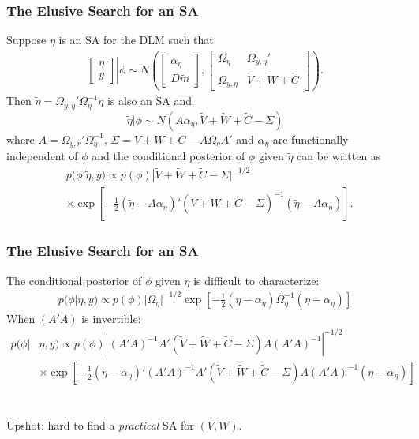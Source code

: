 \documentclass[xcolor=dvipsnames]{beamer}
\begin{document}
\begin{frame}
\frametitle{The Elusive Search for an SA}
Suppose $\eta$ is an SA for the DLM such that
\begin{align*}
 \left. \begin{bmatrix}\eta \\ y \end{bmatrix}\right|\phi \sim N\left(\begin{bmatrix} \alpha_\eta \\ D\tilde{m} \end{bmatrix}, \begin{bmatrix}
   \Omega_\eta & \Omega_{y,\eta}' \\
   \Omega_{y,\eta} & \tilde{V} + \tilde{W} + \tilde{C} \end{bmatrix}\right).
\end{align*}
Then $\tilde{\eta}=\Omega_{y,\eta}'\Omega_{\eta}^{-1}\eta$ is also an SA and
\[
\tilde{\eta}|\phi \sim N(A\alpha_{\eta},\tilde{V} + \tilde{W} + \tilde{C} - \Sigma)
\]
where $A=\Omega_{y,\eta}'\Omega_{\eta}^{-1}$, $\Sigma = \tilde{V} + \tilde{W} + \tilde{C} - A\Omega_{\eta}A'$ and $\alpha_{\eta}$ are functionally independent of $\phi$ and the conditional posterior of $\phi$ given $\tilde{\eta}$ can be written as
\begin{align*}
&p(\phi|\tilde{\eta},y) \propto p(\phi)|\tilde{V} + \tilde{W} + \tilde{C} - \Sigma|^{-1/2}\\
&\times \exp\left[-\frac{1}{2}(\tilde{\eta} - A\alpha_{\eta})'(\tilde{V} + \tilde{W} + \tilde{C} - \Sigma)^{-1}(\tilde{\eta} - A\alpha_{\eta})\right].
\end{align*}
\end{frame}

\begin{frame}
\frametitle{The Elusive Search for an SA}
The conditional posterior of $\phi$ given $\eta$ is difficult to characterize:
\begin{align*}
p(\phi|\eta,y) \propto  p(\phi) |\Omega_{\eta}|^{-1/2}\exp\left[-\frac{1}{2}(\eta-\alpha_{\eta})\Omega_{\eta}^{-1}(\eta-\alpha_{\eta})\right]
\end{align*}
When $(A'A)$ is invertible:
\begin{align*}
p(\phi|&\eta,y) \propto p(\phi) |(A'A)^{-1}A'(\tilde{V} + \tilde{W} + \tilde{C} - \Sigma)A(A'A)^{-1}|^{-1/2}\\
&\times \exp\left[-\frac{1}{2}(\eta - \alpha_{\eta})'(A'A)^{-1}A'(\tilde{V} + \tilde{W} + \tilde{C} - \Sigma)A(A'A)^{-1}(\eta - \alpha_\eta)\right]
\end{align*}
\\~\\
Upshot: hard to find a {\it practical} SA for $(V,W)$.

\end{frame}
\end{document}
